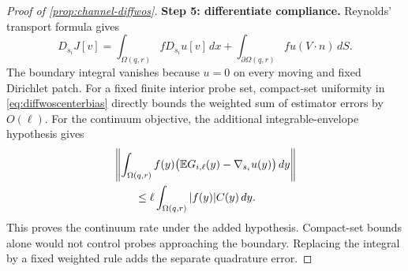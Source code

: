 \begin{proof}[Proof of \cref{prop:channel-diffwos}]
\textbf{Step 5: differentiate compliance.}
Reynolds' transport formula gives
\begin{equation}
 D_{s_i}J[v]
 =\int_{\Omega(q,r)}fD_{s_i}u[v]\,dx
  +\int_{\partial\Omega(q,r)}fu(V\cdot n)\,dS.
 \label{eq:channelreynolds}
\end{equation}
The boundary integral vanishes because $u=0$ on every moving and fixed
Dirichlet patch. For a fixed finite interior probe set, compact-set uniformity in \cref{eq:diffwoscenterbias} directly bounds the weighted sum of estimator errors by $O(\ell)$. For the continuum objective, the additional integrable-envelope hypothesis gives
\[
 \begin{aligned}
 &\left\|\int_{\Omega(q,r)}f(y)
 \bigl(\mathbb{E} G_{i,\ell}(y)-\nabla_{s_i}u(y)\bigr)\,dy\right\|\\
 &\qquad\le \ell\int_{\Omega(q,r)}|f(y)|C(y)\,dy.
 \end{aligned}
\]
This proves the continuum rate under the added hypothesis. Compact-set bounds alone would not control probes approaching the boundary. Replacing the integral by a fixed weighted rule adds the separate quadrature error.
\end{proof}

